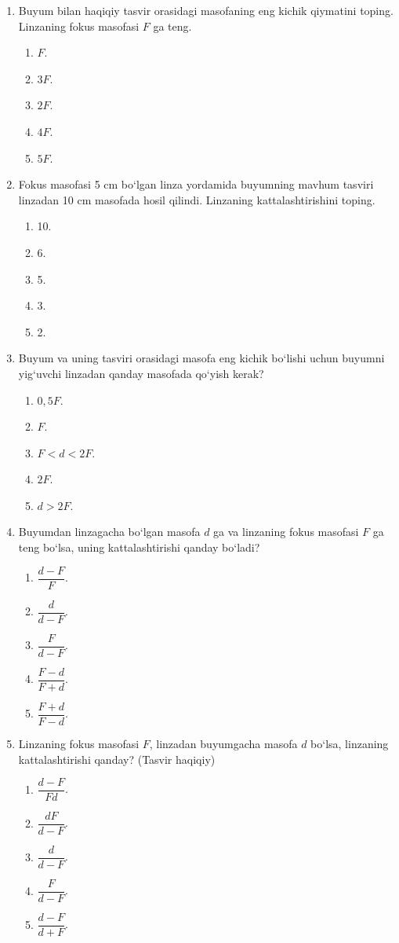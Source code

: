 \begin{enumerate}
\item Buyum bilan haqiqiy tasvir orasidagi masofaning eng kichik qiymatini toping. Linzaning fokus masofasi $F$ ga teng.
\begin{enumerate}[label=\Alph*)]
\item $F$.
\item $3F$.
\item $2F$.
\item $4F$.
\item $5F$.
\end{enumerate}

\item Fokus masofasi 5 cm bo‘lgan linza yordamida buyumning mavhum tasviri linzadan 10 cm masofada hosil qilindi. Linzaning kattalashtirishini toping.
\begin{enumerate}[label=\Alph*)]
\item 10.
\item 6.
\item 5.
\item 3.
\item 2.
\end{enumerate}

\item Buyum va uning tasviri orasidagi masofa eng kichik bo‘lishi uchun buyumni yig‘uvchi linzadan qanday masofada qo‘yish kerak?
\begin{enumerate}[label=\Alph*)]
\item $0{,}5F$.
\item $F$.
\item $F<d<2F$.
\item $2F$.
\item $d>2F$.
\end{enumerate}

\item Buyumdan linzagacha bo‘lgan masofa $d$ ga va linzaning fokus masofasi $F$ ga teng bo‘lsa, uning kattalashtirishi qanday bo‘ladi?
\begin{enumerate}[label=\Alph*)]
\item $\dfrac{d-F}{F}$.
\item $\dfrac{d}{d-F}$.
\item $\dfrac{F}{d-F}$.
\item $\dfrac{F-d}{F+d}$.
\item $\dfrac{F+d}{F-d}$.
\end{enumerate}

\item Linzaning fokus masofasi $F$, linzadan buyumgacha masofa $d$ bo‘lsa, linzaning kattalashtirishi qanday? (Tasvir haqiqiy)
\begin{enumerate}[label=\Alph*)]
\item $\dfrac{d-F}{Fd}$.
\item $\dfrac{dF}{d-F}$.
\item $\dfrac{d}{d-F}$.
\item $\dfrac{F}{d-F}$.
\item $\dfrac{d-F}{d+F}$.
\end{enumerate}





\end{enumerate}
